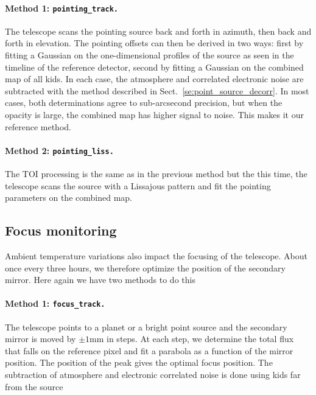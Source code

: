 \paragraph{Method 1: {\tt pointing\_track.}} The telescope scans the
pointing source back and forth in azimuth, then back and forth in elevation. The
pointing offsets can then be derived in two ways: first by fitting a Gaussian on
the one-dimensional profiles of the source as seen in the timeline of the
reference detector, second by fitting a Gaussian on the combined map of all
kids. In each case, the atmosphere and correlated electronic noise are
subtracted with the method described in Sect.~\ref{se:point_source_decorr}. In
most cases, both determinations agree to sub-arcsecond precision, but when the
opacity is large, the combined map has higher signal to noise. This makes it our
reference method.

\paragraph{Method 2: {\tt pointing\_liss.}} The TOI processing is the same as in the
previous method but the this time, the telescope scans the source with a
Lissajous pattern and fit the pointing parameters on the combined map.


\subsection{Focus monitoring}
\label{se:focus}

Ambient temperature variations also impact the focusing of the telescope. About
once every three hours, we therefore optimize the position of the secondary
mirror. Here again we have two methods to do this

\paragraph{Method 1: {\tt focus\_track.}} The telescope points to a planet or a
bright point source and the secondary mirror is moved by $\pm 1$mm in steps. At
each step, we determine the total flux that falls on the reference pixel and fit
a parabola as a function of the mirror position. The position of the peak gives
the optimal focus position. The subtraction of atmosphere and
electronic correlated noise is done using kids far from the source 

